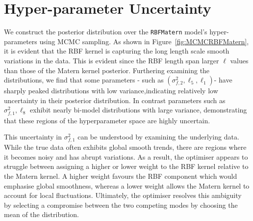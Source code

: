 \documentclass{ucdgradtaughtthesis}
\begin{document}
\section{Hyper-parameter Uncertainty}
We construct the posterior distribution over the \texttt{RBFMatern} model's hyper-parameters using MCMC sampling. As shown in Figure~\ref{fig:MCMCRBFMatern}, it is evident that the RBF kernel is capturing the long length scale smooth variations in the data. This is evident since the RBF length span larger \(\ell\) values than those of the Matern kernel posterior.
Furthering examining the distributions, we find that some parameters - such as \((\sigma_{f,2}^2, \ell_5,\ell_1)\)- have sharply peaked distributions with low variance,indicating relatively low uncertainty in their posterior distribution. 
In contrast parameters such as \(\sigma_{f,1}^2 , \ell_8\) exhibit nearly bi-model distributions with large variance, demonstrating that these regions of the hyperparameter space are highly uncertain.

This uncertainty in \(\sigma_{f,1}^2\) can be understood by examining the underlying data. While the true data often exhibits global smooth trends, there are regions where it becomes noisy and has abrupt variations. As a result, 
the optimiser appears to struggle between assigning a higher or lower weight to the RBF kernel relative to the Matern kernel. 
A higher weight favours the RBF component which would emphasise global smoothness, whereas a lower weight allows the Matern kernel to account for local fluctuations. 
Ultimately, the optimiser resolves this ambiguity by selecting a compromise between the two competing modes by choosing the 
mean of the distribution.
\end{document}
